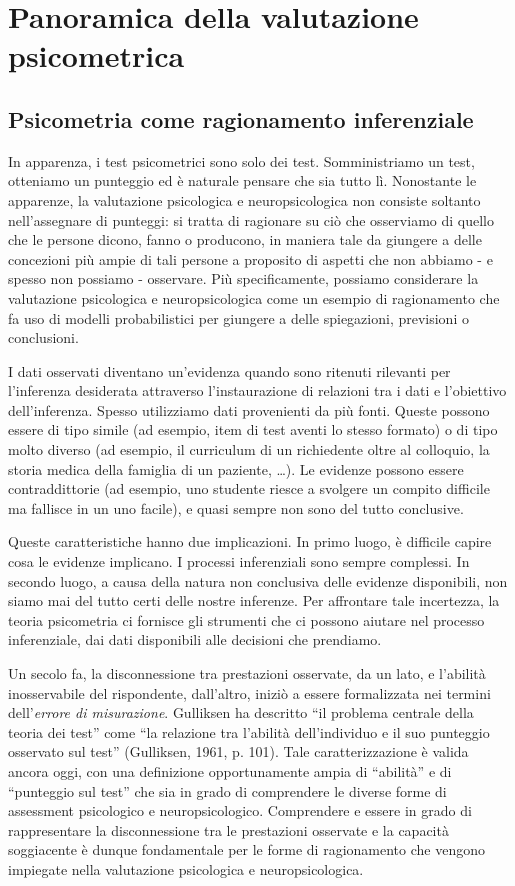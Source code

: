 \chapter{Panoramica della valutazione psicometrica}
\label{ch:panoramica}


\section{Psicometria come ragionamento inferenziale}

In apparenza, i test psicometrici sono solo dei test. Somministriamo un test, otteniamo un punteggio ed è naturale pensare che sia tutto lì. Nonostante le apparenze, la valutazione psicologica e neuropsicologica non consiste soltanto nell'assegnare di punteggi: si tratta di ragionare su ciò che osserviamo di quello che le persone dicono, fanno o producono, in maniera tale da giungere a delle concezioni più ampie di tali persone a proposito di aspetti che non abbiamo - e spesso non possiamo - osservare. Più specificamente, possiamo considerare la valutazione psicologica e neuropsicologica come un esempio di ragionamento che fa uso di modelli  probabilistici per giungere a delle spiegazioni, previsioni o conclusioni. 

I dati osservati diventano un'evidenza quando sono ritenuti rilevanti per l'inferenza desiderata attraverso l'instaurazione di relazioni tra i dati e l'obiettivo dell'inferenza. Spesso utilizziamo dati provenienti da più fonti. Queste possono essere di tipo simile (ad esempio, item di test aventi lo stesso formato) o di tipo molto diverso (ad esempio, il curriculum di un richiedente oltre al colloquio, la storia medica della famiglia di un paziente, \dots). Le evidenze possono essere contraddittorie (ad esempio, uno studente riesce a svolgere un compito difficile ma fallisce in un uno facile), e quasi sempre non sono del tutto conclusive.

Queste caratteristiche hanno due implicazioni. In primo luogo, è difficile capire cosa le evidenze implicano. I processi inferenziali sono sempre complessi. In secondo luogo, a causa della natura non conclusiva delle evidenze disponibili, non siamo mai del tutto certi delle nostre inferenze. Per affrontare tale incertezza, la teoria psicometria ci fornisce gli strumenti che ci possono aiutare nel processo inferenziale, dai dati disponibili alle decisioni che prendiamo. 

Un secolo fa, la disconnessione tra prestazioni osservate, da un lato, e l'abilità inosservabile del rispondente, dall'altro, iniziò a essere formalizzata nei termini dell'\emph{errore di misurazione}. Gulliksen ha descritto ``il problema centrale della teoria dei test'' come ``la relazione tra l'abilità dell'individuo e il suo punteggio osservato sul test'' (Gulliksen, 1961, p. 101). Tale caratterizzazione è valida ancora oggi, con una definizione opportunamente ampia di ``abilità'' e di ``punteggio sul test'' che sia in grado di comprendere le diverse forme di assessment psicologico e neuropsicologico. Comprendere e essere in grado di rappresentare la disconnessione tra le prestazioni osservate e la capacità soggiacente è dunque fondamentale per le forme di ragionamento che vengono impiegate nella valutazione psicologica e neuropsicologica.


